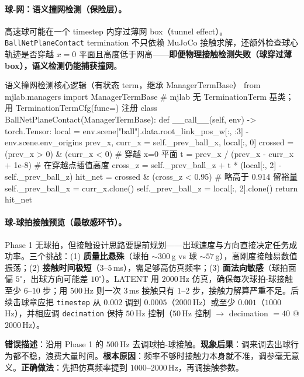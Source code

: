 \paragraph{球-网：语义撞网检测（保险层）。}高速球可能在一个 timestep 内穿过薄网 box（tunnel effect）。\verb|BallNetPlaneContact| termination 不只依赖 MuJoCo 接触求解，还额外检查球心轨迹是否穿越 $x=0$ 平面且高度低于网高——\textbf{即便物理接触检测失败（球穿过薄 box），语义检测仍能捕获撞网}。

\begin{codebox}[Python]{语义撞网检测核心逻辑（有状态 term，继承 ManagerTermBase）}
from mjlab.managers import ManagerTermBase    # mjlab 无 TerminationTerm 基类；用 TerminationTermCfg(func=) 注册
class BallNetPlaneContact(ManagerTermBase):
    def __call__(self, env) -> torch.Tensor:
        local = env.scene["ball"].data.root_link_pos_w[:, :3] - env.scene.env_origins
        prev_x, curr_x = self._prev_ball_x, local[:, 0]
        crossed = (prev_x > 0) & (curr_x < 0)                 # 穿越 x=0 平面
        t = prev_x / (prev_x - curr_x + 1e-8)                 # 在穿越点插值高度
        cross_z = self._prev_ball_z + t * (local[:, 2] - self._prev_ball_z)
        hit_net = crossed & (cross_z < 0.95)                  # 略高于 0.914 留裕量
        self._prev_ball_x = curr_x.clone()
        self._prev_ball_z = local[:, 2].clone()
        return hit_net
\end{codebox}

\paragraph{球-球拍接触预览（最敏感环节）。}Phase 1 无球拍，但接触设计思路要提前规划——出球速度与方向直接决定任务成功率。三个挑战：(1) \textbf{质量比悬殊}（球拍 $\sim300$\,g vs 球 $\sim57$\,g），高刚度接触易数值振荡；(2) \textbf{接触时间极短}（$3$--$5$\,ms），需足够高仿真频率；(3) \textbf{面法向敏感}（球拍面偏 $5^\circ$，出球方向可能差 $10^\circ$）。LATENT 用 $2000$\,Hz 仿真\cite{tennis_latent2026}，确保每次球拍-球接触至少 $6$--$10$ 步；用 $500$\,Hz 则一次 $3$\,ms 接触只有 $1$--$2$ 步，接触力解算严重不足。后续击球章应把 \verb|timestep| 从 $0.002$ 调到 $0.0005$（$2000$\,Hz）或至少 $0.001$（$1000$\,Hz），并相应调 \verb|decimation| 保持 $50$\,Hz 控制（$50$\,Hz 控制 $\to$ decimation $=40$ @ $2000$\,Hz）。

\begin{pitfall}[在 500 Hz 仿真下调球拍接触参数]
\textbf{错误描述}：沿用 Phase 1 的 $500$\,Hz 去调球拍-球接触。\textbf{现象后果}：调来调去出球行为都不稳，浪费大量时间。\textbf{根本原因}：频率不够时接触力本身就不准，调参毫无意义。\textbf{正确做法}：先把仿真频率提到 $1000$--$2000$\,Hz，再调接触参数。
\end{pitfall}

